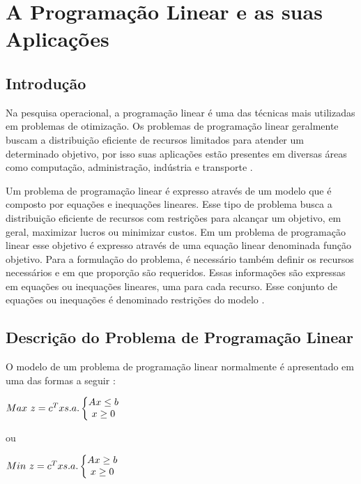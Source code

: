 \chapter{A Programação Linear e as suas Aplicações}

\section{Introdução}
Na pesquisa operacional, a programação linear é uma das técnicas mais utilizadas em problemas de otimização. Os problemas de programação linear geralmente buscam a distribuição eficiente de recursos limitados para atender um determinado objetivo, por isso suas aplicações estão presentes em diversas áreas como computação, administração, indústria e transporte \cite{Engecom}.

Um problema de programação linear é expresso através de um modelo que é composto por equações e inequações lineares. Esse tipo de problema busca a distribuição eficiente de recursos com restrições para alcançar um objetivo, em geral, maximizar lucros ou minimizar custos. Em um problema de programação linear esse objetivo é expresso através de uma equação linear denominada função objetivo. Para a formulação do problema, é necessário também definir os recursos necessários e em que proporção são requeridos. Essas informações são expressas em equações ou inequações lineares, uma para cada recurso. Esse conjunto de equações ou inequações é denominado restrições do modelo \cite{Engecom}.

\section{Descrição do Problema de Programação Linear}
O modelo de um problema de programação linear normalmente é apresentado em uma das formas a seguir \cite{Passos}:

$\\Max\ z = c^{T}x \\\\s.a.\left\{\begin{matrix}
Ax\leq b\\x\geq 0 
\end{matrix}\right.$  

ou  

$\\Min\ z = c^{T}x \\\\s.a.\left\{\begin{matrix}
Ax\geq  b\\x\geq 0 
\end{matrix}\right.$

